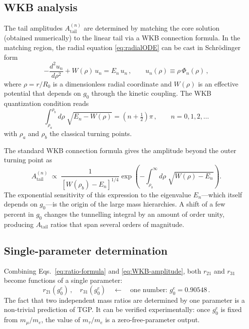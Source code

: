 \documentclass[11pt,a4paper]{article}
\newcommand{\gz}{g_0^e}
\newcommand{\Atail}{A_{\mathrm{tail}}}
\newcommand{\mt}{m_\tau}
\newcommand{\mmu}{m_\mu}
\newcommand{\me}{m_e}
\begin{document}
\subsection{WKB analysis}

The tail amplitudes $\Atail^{(n)}$ are determined by matching the
core solution (obtained numerically) to the linear tail via a WKB
connection formula.  In the matching region, the radial equation
\eqref{eq:radialODE} can be cast in Schr\"odinger form
\begin{equation}\label{eq:schrodinger}
  -\frac{d^2 u_n}{d\rho^2} + W(\rho)\,u_n = E_n\,u_n\,,
  \qquad u_n(\rho) \equiv \rho\,\Phi_n(\rho)\,,
\end{equation}
where $\rho = r/R_0$ is a dimensionless radial coordinate and
$W(\rho)$ is an effective potential that depends on $g_0$ through
the kinetic coupling.  The WKB quantization condition reads
\begin{equation}\label{eq:WKB}
  \int_{\rho_a}^{\rho_b} d\rho\;\sqrt{E_n - W(\rho)}
  = \left(n + \tfrac{1}{2}\right)\pi\,,
  \qquad n = 0,1,2,\ldots
\end{equation}
with $\rho_a$ and $\rho_b$ the classical turning points.

The standard WKB connection formula gives the amplitude beyond the
outer turning point as
\begin{equation}\label{eq:WKB-amplitude}
  \Atail^{(n)} \;\propto\;
  \frac{1}{\left[W(\rho_b)-E_n\right]^{1/4}}
  \exp\!\left(-\int_{\rho_b}^{\infty}\!d\rho\;
  \sqrt{W(\rho)-E_n}\right).
\end{equation}
The exponential sensitivity of this expression to the eigenvalue
$E_n$---which itself depends on $g_0$---is the origin of the
large mass hierarchies.  A shift of a few percent in $g_0$ changes
the tunnelling integral by an amount of order unity, producing
$\Atail$ ratios that span several orders of magnitude.

\subsection{Single-parameter determination}

Combining Eqs.~\eqref{eq:ratio-formula} and \eqref{eq:WKB-amplitude},
both $r_{21}$ and $r_{31}$ become functions of a single parameter:
\begin{equation}\label{eq:key}
  \boxed{
    r_{21}(\gz)\,,\quad r_{31}(\gz)
    \quad\longleftarrow\quad
    \text{one number: } \gz = 0.90548\,.
  }
\end{equation}
The fact that two independent mass ratios are determined by one
parameter is a non-trivial prediction of TGP.  It can be verified
experimentally: once $\gz$ is fixed from $\mmu/\me$, the value of
$\mt/\me$ is a zero-free-parameter output.
\end{document}
